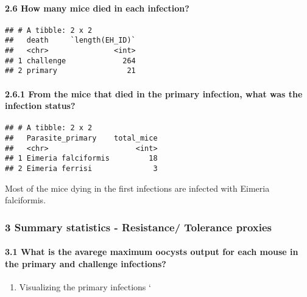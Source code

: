 \documentclass[
]{article}
\providecommand{\tightlist}{%
  \setlength{\itemsep}{0pt}\setlength{\parskip}{0pt}}
\begin{document}
\hypertarget{how-many-mice-died-in-each-infection}{%
\paragraph{2.6 How many mice died in each
infection?}\label{how-many-mice-died-in-each-infection}}

\begin{verbatim}
## # A tibble: 2 x 2
##   death     `length(EH_ID)`
##   <chr>               <int>
## 1 challenge             264
## 2 primary                21
\end{verbatim}

\hypertarget{from-the-mice-that-died-in-the-primary-infection-what-was-the-infection-status}{%
\paragraph{2.6.1 From the mice that died in the primary infection, what
was the infection
status?}\label{from-the-mice-that-died-in-the-primary-infection-what-was-the-infection-status}}

\begin{verbatim}
## # A tibble: 2 x 2
##   Parasite_primary    total_mice
##   <chr>                    <int>
## 1 Eimeria falciformis         18
## 2 Eimeria ferrisi              3
\end{verbatim}

Most of the mice dying in the first infections are infected with Eimeria
falciformis.

\hypertarget{summary-statistics---resistance-tolerance-proxies}{%
\subsubsection{3 Summary statistics - Resistance/ Tolerance
proxies}\label{summary-statistics---resistance-tolerance-proxies}}

\hypertarget{what-is-the-avarege-maximum-oocysts-output-for-each-mouse-in-the-primary-and-challenge-infections}{%
\paragraph{3.1 What is the avarege maximum oocysts output for each mouse
in the primary and challenge
infections?}\label{what-is-the-avarege-maximum-oocysts-output-for-each-mouse-in-the-primary-and-challenge-infections}}

\begin{enumerate}
\def\labelenumi{\arabic{enumi}.}
\tightlist
\item
  Visualizing the primary infections `
\end{enumerate}
\end{document}
